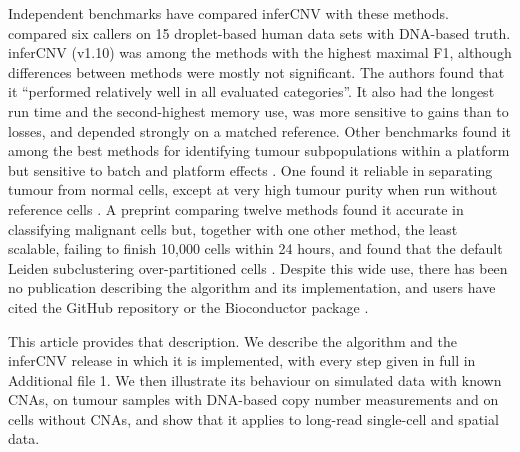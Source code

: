 Independent benchmarks have compared inferCNV with these methods. \citet{schmid2025} compared six callers on 15 droplet-based human data sets with DNA-based truth. inferCNV (v1.10) was among the methods with the highest maximal F1, although differences between methods were mostly not significant. The authors found that it ``performed relatively well in all evaluated categories''. It also had the longest run time and the second-highest memory use, was more sensitive to gains than to losses, and depended strongly on a matched reference. Other benchmarks found it among the best methods for identifying tumour subpopulations within a platform but sensitive to batch and platform effects \citep{chen2025}. One found it reliable in separating tumour from normal cells, except at very high tumour purity when run without reference cells \citep{song2025}. A preprint comparing twelve methods found it accurate in classifying malignant cells but, together with one other method, the least scalable, failing to finish 10,000 cells within 24 hours, and found that the default Leiden subclustering over-partitioned cells \citep{chang2026preprint}. Despite this wide use, there has been no publication describing the algorithm and its implementation, and users have cited the GitHub repository or the Bioconductor package \citep{tickle2019infercnv, infercnvBioc}.

This article provides that description. We describe the algorithm and the inferCNV release in which it is implemented, with every step given in full in Additional file 1. We then illustrate its behaviour on simulated data with known CNAs, on tumour samples with DNA-based copy number measurements and on cells without CNAs, and show that it applies to long-read single-cell and spatial data.
